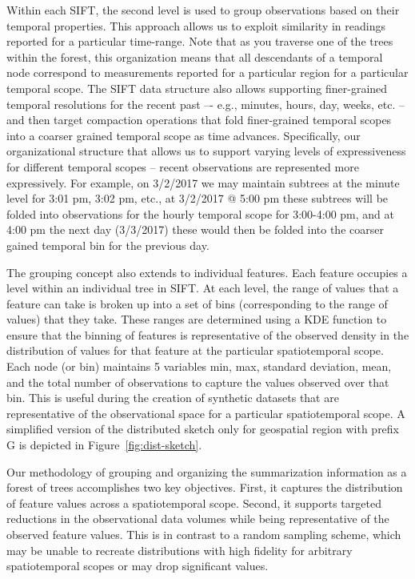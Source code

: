 Within each SIFT, the second level is used to group observations based on their temporal properties. This approach allows us to exploit similarity in readings reported for a particular time-range. Note that as you traverse one of the trees within the forest, this organization means that all descendants of a temporal node correspond to measurements reported for a particular region for a particular temporal scope. The SIFT data structure also allows supporting finer-grained temporal resolutions for the recent past –- e.g., minutes, hours, day, weeks, etc. – and then target compaction operations that fold finer-grained temporal scopes into a coarser grained temporal scope as time advances. Specifically, our organizational structure that allows us to support varying levels of expressiveness for different temporal scopes – recent observations are represented more expressively. For example, on 3/2/2017 we may maintain subtrees at the minute level for 3:01 pm, 3:02 pm, etc., at 3/2/2017 @ 5:00 pm these subtrees will be folded into observations for the hourly temporal scope for 3:00-4:00 pm, and at 4:00 pm the next day (3/3/2017) these would then be folded into the coarser gained temporal bin for the previous day. 

The grouping concept also extends to individual features. Each feature occupies a level within an individual tree in SIFT. At each level, the range of values that a feature can take is broken up into a set of bins (corresponding to the range of values) that they take. These ranges are determined using a KDE function to ensure that the binning of features is representative of the observed density in the distribution of values for that feature at the particular spatiotemporal scope. Each node (or bin) maintains 5 variables min, max, standard deviation, mean, and the total number of observations to capture the values observed over that bin.  This is useful during the creation of synthetic datasets that are representative of the observational space for a particular spatiotemporal scope. A simplified version of the distributed sketch only for geospatial region with prefix G is depicted in Figure~\ref{fig:dist-sketch}. 

Our methodology of grouping and organizing the summarization information as a forest of trees accomplishes two key objectives. First, it captures the distribution of feature values across a spatiotemporal scope. Second, it supports targeted reductions in the observational data volumes while being representative of the observed feature values. This is in contrast to a random sampling scheme, which may be unable to recreate distributions with high fidelity for arbitrary spatiotemporal scopes or may drop significant values.

